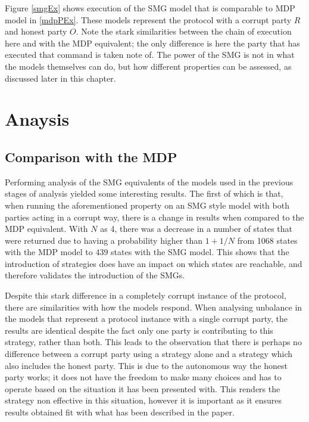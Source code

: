 \documentclass{l4proj}
\begin{document}
Figure \ref{smgEx} shows execution of the SMG model that is comparable to MDP model in \ref{mdpPEx}. These models represent the protocol with a corrupt party $R$ and honest party $O$. Note the stark similarities between the chain of execution here and with the MDP equivalent; the only difference is here the party that has executed that command is taken note of. The power of the SMG is not in what the models themselves can do, but how different properties can be assessed, as discussed later in this chapter.


\section{Anaysis}

\subsection{Comparison with the MDP}
Performing analysis of the SMG equivalents of the models used in the previous stages of analysis yielded some interesting results. The first of which is that, when running the aforementioned property on an SMG style model with both parties acting in a corrupt way, there is a change in results when compared to the MDP equivalent. With $N$ as 4, there was a decrease in a number of states that were returned due to having a probability higher than $1+1/N$ from 1068 states with the MDP model to 439 states with the SMG model. This shows that the introduction of strategies does have an impact on which states are reachable, and therefore validates the introduction of the SMGs.

Despite this stark difference in a completely corrupt instance of the protocol, there are similarities with how the models respond. When analysing unbalance in the models that represent a protocol instance with a single corrupt party, the results are identical despite the fact only one party is contributing to this strategy, rather than both. This leads to the observation that there is perhaps no difference between a corrupt party using a strategy alone and a strategy which also includes the honest party. This is due to the autonomous way the honest party works; it does not have the freedom to make many choices and has to operate based on the situation it has been presented with. This renders the strategy non effective in this situation, however it is important as it ensures results obtained fit with what has been described in the paper.
\end{document}
